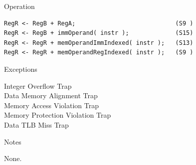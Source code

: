 \begin{iPageDescOpEntry}{Operation}
\begin{lstlisting}[style=iPageOpStyle]
RegR <- RegB + RegA;                            (S9 )
RegR <- RegB + immOperand( instr );             (S15)
RegR <- RegR + memOperandImmIndexed( instr );   (S13)
RegR <- RegR + memOperandRegIndexed( instr );   (S9 )
\end{lstlisting}
\end{iPageDescOpEntry}

\begin{iPageDescEntry}{Exceptions}{

 	Integer Overflow Trap\\
	Data Memory Alignment Trap\\
	Memory Access Violation Trap\\
	Memory Protection Violation Trap\\
	Data TLB Miss Trap
}
\end{iPageDescEntry}

\begin{iPageDescEntry}{Notes}{

	None. 
}
\end{iPageDescEntry}
